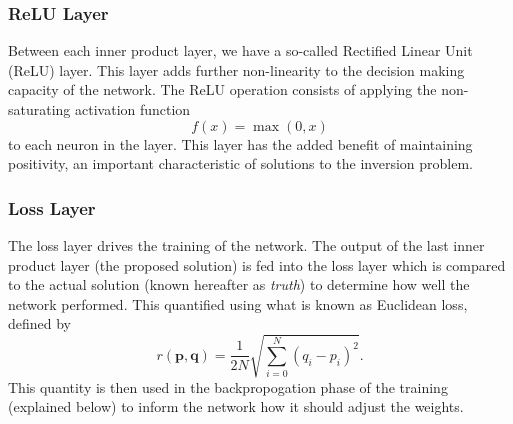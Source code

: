 \documentclass[twoside]{article}
\begin{document}
\begin{multicols}{2}
\subsubsection{ReLU Layer}
Between each inner product layer, we have a so-called Rectified Linear Unit (ReLU) layer. This layer adds further non-linearity to the decision making capacity of the network. The ReLU operation consists of applying the non-saturating activation function
\begin{equation}
f(x) = \max(0, x)
\end{equation} to each neuron in the layer. This layer has the added benefit of maintaining positivity, an important characteristic of solutions to the inversion problem.
\subsubsection{Loss Layer}
The loss layer drives the training of the network. The output of the last inner product layer (the proposed solution) is fed into the loss layer which is compared to the actual solution (known hereafter as \textit{truth}) to determine how well the network performed. This quantified using what is known as Euclidean loss, defined by
\begin{equation}
r(\mathbf{p},\mathbf{q}) = \frac{1}{2N} \sqrt{\sum_{i=0}^{N}(q_i - p_i)^2}.
\end{equation}
This quantity is then used in the backpropogation phase of the training (explained below) to inform the network how it should adjust the weights.

\end{multicols}
\end{document}
